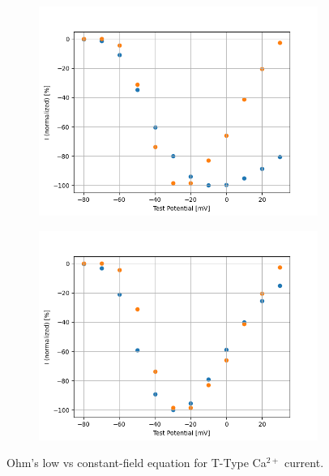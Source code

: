 \documentclass[../../workflow.tex]{subfiles}
\begin{document}
\begin{figure}[H]
    \begin{subfigure}[t]{0.45\textwidth}
        \centering
        \includegraphics[width=\textwidth]{./img/t_type_calcium_channel/simulations/No Scale/Ohm's LawVoltage Step5_IV_Relationship_comparison_Jeong_2015.png}
        \caption{}
        \label{fig_t_type_ohmic_iv_relationship}
    \end{subfigure}
    \hfill
    \begin{subfigure}[t]{0.45\textwidth}
        \centering
        \includegraphics[width=\textwidth]{./img/t_type_calcium_channel/simulations/No Scale/Constant Field EquationVoltage Step5_IV_Relationship_comparison_Jeong_2015.png}
        \caption{}
        \label{fig_t_type_constant_field_iv_relationship}
    \end{subfigure}
    
    \caption{Ohm's low vs constant-field equation for T-Type Ca$^{2+}$ current.}
    \label{fig_t_type_voltage_step_ohmic_vs_constant_field}
\end{figure}
\end{document}
